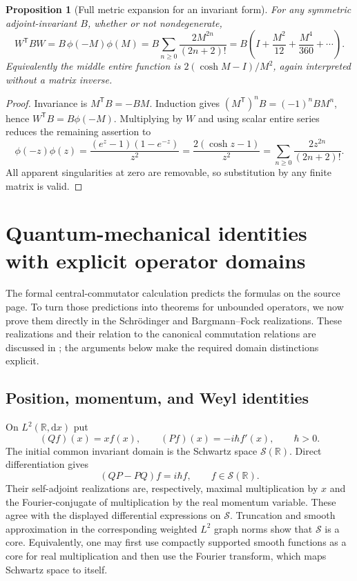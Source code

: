 \documentclass[11pt]{article}
\newtheorem{proposition}[theorem]{Proposition}
\theoremstyle{definition}
\theoremstyle{remark}
\newcommand{\R}{\mathbb R}
\newcommand{\dd}{\mathrm d}
\numberwithin{equation}{section}
\begin{document}
\begin{proposition}[Full metric expansion for an invariant form]\label{prop:metricseries}
For any symmetric adjoint-invariant $B$, whether or not nondegenerate,
\begin{equation}\label{eq:metricseries}
 W^{\mathsf T}BW
 =B\,\phi(-M)\phi(M)
 =B\sum_{n\geq0}\frac{2M^{2n}}{(2n+2)!}
 =B\left(I+\frac{M^2}{12}+\frac{M^4}{360}+\cdots\right).
\end{equation}
Equivalently the middle entire function is $2(\cosh M-I)/M^2$, again interpreted without a matrix inverse.
\end{proposition}
\begin{proof}
Invariance is $M^{\mathsf T}B=-BM$. Induction gives $(M^{\mathsf T})^nB=(-1)^nBM^n$, hence $W^{\mathsf T}B=B\phi(-M)$. Multiplying by $W$ and using scalar entire series reduces the remaining assertion to
\[
 \phi(-z)\phi(z)=\frac{(e^z-1)(1-e^{-z})}{z^2}
       =\frac{2(\cosh z-1)}{z^2}
       =\sum_{n\geq0}\frac{2z^{2n}}{(2n+2)!}.
\]
All apparent singularities at zero are removable, so substitution by any finite matrix is valid.
\end{proof}

\section{Quantum-mechanical identities with explicit operator domains}\label{sec:quantum}
The formal central-commutator calculation predicts the formulas on the source page. To turn those predictions into theorems for unbounded operators, we now prove them directly in the Schr\"odinger and Bargmann--Fock realizations. These realizations and their relation to the canonical commutation relations are discussed in \cite{hallholomorphic}; the arguments below make the required domain distinctions explicit.

\subsection{Position, momentum, and Weyl identities}
On $L^2(\R,\dd x)$ put
\begin{equation}\label{eq:QP}
 (Qf)(x)=xf(x),\qquad (Pf)(x)=-i\hbar f'(x),\qquad \hbar>0.
\end{equation}
The initial common invariant domain is the Schwartz space $\mathcal S(\R)$. Direct differentiation gives
\begin{equation}\label{eq:CCR}
 (QP-PQ)f=i\hbar f,\qquad f\in\mathcal S(\R).
\end{equation}
Their self-adjoint realizations are, respectively, maximal multiplication by $x$ and the Fourier-conjugate of multiplication by the real momentum variable. These agree with the displayed differential expressions on $\mathcal S$. Truncation and smooth approximation in the corresponding weighted $L^2$ graph norms show that $\mathcal S$ is a core. Equivalently, one may first use compactly supported smooth functions as a core for real multiplication and then use the Fourier transform, which maps Schwartz space to itself.
\end{document}
